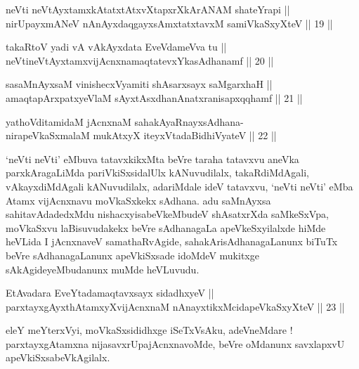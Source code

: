 \begin{shl}
neVti neVtAyxtamxkAtatxtAtxvXtapxrXkArANAM shateYrapi || \\
nirUpayxmANeV nAnAyxdaqgayxsAmxtatxtavxM samiVkaSxyXteV ||  19 ||  
\end{shl}
				
\begin{shl}
takaRtoV yadi vA vAkAyxdata EveVdameVva tu || \\
neVtineVtAyxtamxvijAcnxnamaqtatevxYkasAdhanamf ||  20 || 
\end{shl}
				
\begin{shl}
sasaMnAyxsaM vinishecxVyamiti shAsarxsayx saMgarxhaH || \\
amaqtapArxpatxyeV\s laM sAyxtAsxdhanAnatxranisapxqqhamf ||  21 ||  
\end{shl}
				
\begin{shl}
yathoVditamidaM jAcnxnaM sahakAyaRnayxsAdhana-\\
nirapeVkaSxmalaM mukAtxyX iteyxVtadaBidhiVyateV ||  22 ||  
\end{shl}

\begin{artha}
`neVti neVti' eMbuva tatavxkikxMta beVre taraha tatavxvu aneVka parxkAragaLiMda pariVkiSxsidalUlx kANuvudilalx, takaRdiMdAgali, vAkayxdiMdAgali kANuvudilalx, adariMdale ideV tatavxvu, `neVti neVti' eMba Atamx vijAcnxnavu moVkaSxkekx sAdhana. adu saMnAyxsa sahitavAdadedxMdu nishacxyisabeVkeMbudeV shAsatxrXda saMkeSxVpa, moVkaSxvu laBisuvudakekx beVre sAdhanagaLa apeVkeSxyilalxde hiMde heVLida I jAcnxnaveV samathaRvAgide, sahakArisAdhanagaLanunx biTuTx beVre sAdhanagaLanunx apeVkiSxsade idoMdeV mukitxge sAkAgideyeMbudanunx muMde heVLuvudu.
\end{artha}


\begin{shl}
EtAvadara EveYtadamaqtavxsayx sidadhxyeV || \\
parxtayxgAyxthAtamxyXvijAcnxnaM nAnayxtikxMcidapeVkaSxyXteV ||  23 ||  
\end{shl}

\begin{artha}
eleY meYterxVyi, moVkaSxsididhxge iSeTxVsAku, adeVneMdare ! parxtayxgAtamxna nijasavxrUpajAcnxnavoMde, beVre oMdanunx savxlapxvU apeVkiSxsabeVkAgilalx.
\end{artha}


